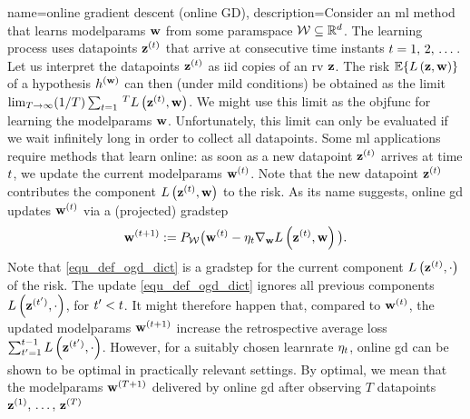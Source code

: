 {name={online gradient descent (online GD)}, 
	description={Consider  an \gls{ml} method that learns \glspl{modelparam} 
		${\bf w}$ from some \gls{paramspace} $\mathcal{W} \subseteq \mathbb{R}^{d}$. 
		The learning process uses \gls{datapoint}s ${\bf z}^{(t)}$ that arrive at consecutive time instants $t=1, \,2, \,\dots$. 
		Let us interpret the \gls{datapoint}s ${\bf z}^{(t)}$ as \gls{iid} copies 
		of an \gls{rv} ${\bf z}$. The \gls{risk} $\mathbb{E}\{ L\left({\bf z},{\bf w} \right) \}$ of a 
		\gls{hypothesis} $h^{({\bf w})}$ can then (under mild conditions) be obtained as the limit 
		$\lim_{T\rightarrow \infty} (1/T)\sum_{t=1}\,^{T} L\left({\bf z}^{(t)},{\bf w} \right)$. 
		We might use this limit as the \gls{objfunc} for learning the \glspl{modelparam} ${\bf w}$. 
		Unfortunately, this limit can only be evaluated if we wait infinitely long in order to collect all \gls{datapoint}s. 
		Some \gls{ml} applications require methods that learn online: as soon as a new \gls{datapoint} ${\bf z}^{(t)}$ 
		arrives at time $t$, we update the current \glspl{modelparam} ${\bf w}^{(t)}$. Note that 
		the new \gls{datapoint} ${\bf z}^{(t)}$ contributes the component $L\left({\bf z}^{(t)},{\bf w} \right)$ 
		to the \gls{risk}. As its name suggests, online \gls{gd} updates ${\bf w}^{(t)}$ via a (projected) \gls{gradstep}
		\begin{equation} 
			\label{equ_def_ogd_dict}
 			{\bf w}^{(t+1)} := P_{\mathcal{W}}\big( {\bf w}^{(t)} - \eta_{t} \nabla_{{\bf w}} L\left({\bf z}^{(t)},{\bf w} \right)\big). 
		\end{equation} 
		Note that \eqref{equ_def_ogd_dict} is a \gls{gradstep} for the current component $L\left({\bf z}^{(t)},\cdot \right)$ 
		of the \gls{risk}. The update \eqref{equ_def_ogd_dict} ignores all previous components $L\left({\bf z}^{(t')},\cdot \right)$, 
		for $t' < t$. It might therefore happen that, compared to ${\bf w}^{(t)}$, the updated \glspl{modelparam} 
		${\bf w}^{(t+1)}$ increase the retrospective average \gls{loss} $\sum_{t'=1}^{t-1} L\left({\bf z}^{(t')},\cdot \right)$. 
		However, for a suitably chosen \gls{learnrate} $\eta_{t}$, online \gls{gd} can be shown 
		to be optimal in practically relevant settings. By optimal, we mean that the \glspl{modelparam} 
		${\bf w}^{(T+1)}$ delivered by online \gls{gd} after observing $T$ \gls{datapoint}s ${\bf z}^{(1)}, \,\ldots, \,{\bf z}^{(T)}$ 
}}
